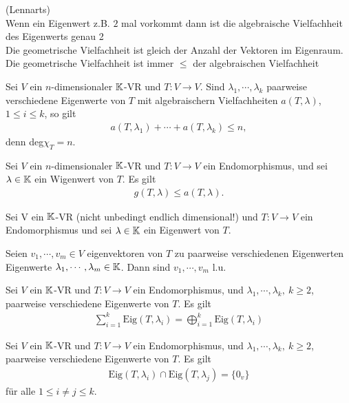 \begin{remark}
(Lennarts)\\
Wenn ein Eigenwert z.B. $2$ mal vorkommt dann ist die algebraische Vielfachheit des Eigenwerts genau 2\\
Die geometrische Vielfachheit ist gleich der Anzahl der Vektoren im Eigenraum. \\
Die geometrische Vielfachheit ist immer $\leq$ der algebraischen Vielfachheit
\end{remark}

\begin{remark}
Sei $V$ ein $n$-dimensionaler $\mathbb{K}$-VR und $T:V\to V$. Sind $\lambda_1,\dotsb,\lambda_k$ paarweise verschiedene Eigenwerte von $T$ mit algebraischern Vielfachheiten $a(T,\lambda)$, $1\leq i \leq k$, so gilt 
\begin{align*}
    a(T,\lambda_1)+\dotsb+a(T,\lambda_k)\leq n,
\end{align*}
denn deg$\chi_T=n.$
\end{remark}

\begin{theorem}
Sei $V$ ein $n$-dimensionaler $\mathbb{K}$-VR und $T:V\to V$ ein Endomorphismus, und sei $\lambda\in\mathbb{K}$ ein Wigenwert von $T$. Es gilt
\begin{align*}
    g(T,\lambda)\leq a(T,\lambda).
\end{align*}
\end{theorem}

Sei V ein $\mathbb{K}$-VR (nicht unbedingt endlich dimensional!) und $T:V\to V$ ein Endomorphismus und sei $\lambda\in \mathbb{K}$ ein Eigenwert von $T$.

\begin{theorem}
Seien $v_1,\dotsb,v_m\in V$ eigenvektoren von $T$ zu paarweise verschiedenen Eigenwerten Eigenwerte $\lambda_1,\dotsb,\lambda_m\in \mathbb{K}$. Dann sind $v_1,\dotsb,v_m$ l.u.
\end{theorem}

\begin{lemma}
Sei $V$ ein $\mathbb{K}$-VR und $T:V\to V$ ein Endomorphismus, und $\lambda_1,\dotsb,\lambda_k,\ k\geq2$, paarweise verschiedene Eigenwerte von $T$. Es gilt
\begin{align*}
    \sum_{i=1}^k\text{Eig}(T,\lambda_i)=\bigoplus_{i=1}^k\text{Eig}(T,\lambda_i)
\end{align*}
\end{lemma}

\begin{lemma}
Sei $V$ ein $\mathbb{K}$-VR und $T:V\to V$ ein Endomorphismus, und $\lambda_1,\dotsb,\lambda_k,\ k\geq2$, paarweise verschiedene Eigenwerte von $T$. Es gilt
\begin{align*}
    \text{Eig}(T,\lambda_i)\cap\text{Eig}(T,\lambda_j)=\{0_v\}
\end{align*}
für alle $1\leq i \neq j \leq k$.
\end{lemma}

